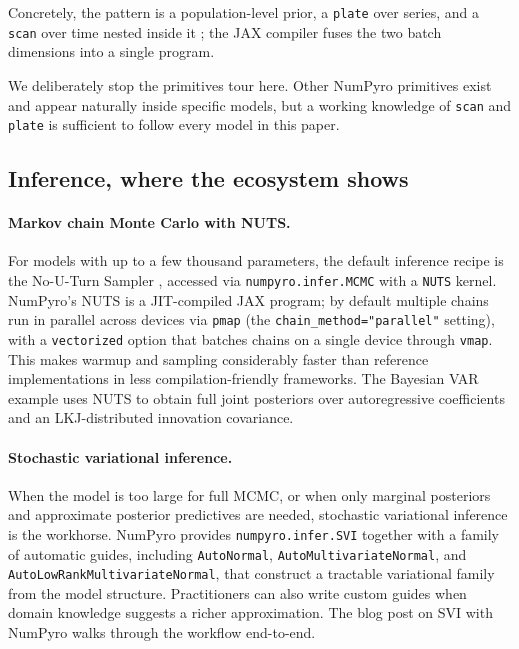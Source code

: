 \documentclass[11pt,3p,review,authoryear]{elsarticle}
\begin{document}
Concretely, the pattern is a population-level prior, a \texttt{plate} over series, and a \texttt{scan} over time nested inside it \citep{numpyro_hierarchical_tutorial}; the JAX compiler fuses the two batch dimensions into a single program.

We deliberately stop the primitives tour here. Other NumPyro primitives exist and appear naturally inside specific models, but a working knowledge of \texttt{scan} and \texttt{plate} is sufficient to follow every model in this paper.

\subsection{Inference, where the ecosystem shows}

\paragraph{Markov chain Monte Carlo with NUTS.}
For models with up to a few thousand parameters, the default inference recipe is the No-U-Turn Sampler \citep{hoffman2014no}, accessed via \texttt{numpyro.infer.MCMC} with a \texttt{NUTS} kernel. NumPyro's NUTS is a JIT-compiled JAX program; by default multiple chains run in parallel across devices via \texttt{pmap} (the \texttt{chain\_method="parallel"} setting), with a \texttt{vectorized} option that batches chains on a single device through \texttt{vmap}. This makes warmup and sampling considerably faster than reference implementations in less compilation-friendly frameworks. The Bayesian VAR example \citep{orduz_var} uses NUTS to obtain full joint posteriors over autoregressive coefficients and an LKJ-distributed innovation covariance.

\paragraph{Stochastic variational inference.}
When the model is too large for full MCMC, or when only marginal posteriors and approximate posterior predictives are needed, stochastic variational inference \citep{blei2017variational} is the workhorse. NumPyro provides \texttt{numpyro.infer.SVI} together with a family of automatic guides, including \texttt{AutoNormal}, \texttt{AutoMultivariateNormal}, and \texttt{AutoLowRankMultivariateNormal}, that construct a tractable variational family from the model structure. Practitioners can also write custom guides when domain knowledge suggests a richer approximation. The blog post on SVI with NumPyro \citep{orduz_svi} walks through the workflow end-to-end.
\end{document}
